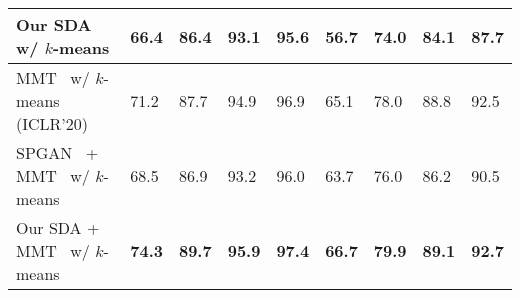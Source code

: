 \documentclass[journal]{IEEEtran}
\begin{document}
\begin{table*}[t]
\begin{center}
\begin{tabular}{P{5cm}|C{1cm}C{1cm}C{1cm}C{1cm}|C{1cm}C{1cm}C{1cm}C{1cm}}
	Our SDA w/ {$k$-means} & {66.4} & {86.4} & {93.1} & {95.6} & {56.7} & {74.0} & {84.1} & {87.7} \\
	\hline
	MMT~\cite{ge2020mutual} w/ {$k$-means} (ICLR'20) & {71.2} & {87.7} & {94.9} & {96.9} & {65.1} & {78.0} & {88.8} & {92.5} \\
	 {SPGAN~\cite{deng2018image} + MMT~\cite{ge2020mutual} w/ {$k$-means}} & 68.5 & 86.9 & 93.2 & 96.0 & 63.7 & 76.0 & 86.2 & 90.5 \\
	Our SDA + MMT~\cite{ge2020mutual} w/ {$k$-means} & \textbf{74.3} & \textbf{89.7} & \textbf{95.9} & \textbf{97.4} & \textbf{66.7} & \textbf{79.9} & \textbf{89.1} & \textbf{92.7} \\
	\hline
	\end{tabular}
	\end{center}
\end{table*}
\end{document}

